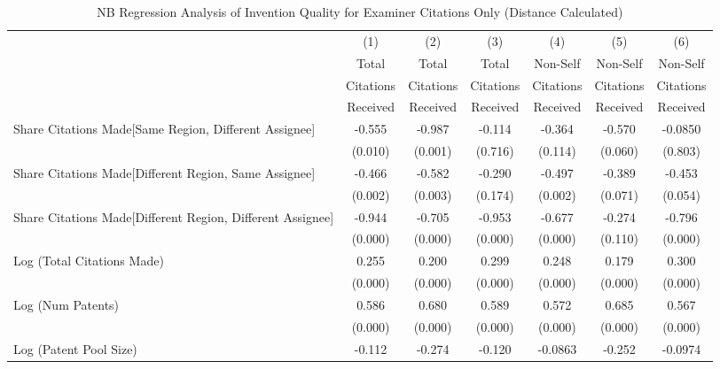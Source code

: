 \begin{table}[htbp]\centering
\caption{NB Regression Analysis of Invention Quality for Examiner Citations Only (Distance Calculated) \label{e.model123192021}}
\scriptsize
\singlespacing
\begin{tabular}{l*{6}{c}}
\hline\hline
                &\multicolumn{1}{c}{(1)}&\multicolumn{1}{c}{(2)}&\multicolumn{1}{c}{(3)}&\multicolumn{1}{c}{(4)}&\multicolumn{1}{c}{(5)}&\multicolumn{1}{c}{(6)}\\
                &\multicolumn{1}{c}{Total}&\multicolumn{1}{c}{Total}&\multicolumn{1}{c}{Total}&\multicolumn{1}{c}{Non-Self}&\multicolumn{1}{c}{Non-Self}&\multicolumn{1}{c}{Non-Self}\\
                &\multicolumn{1}{c}{Citations}&\multicolumn{1}{c}{Citations}&\multicolumn{1}{c}{Citations}&\multicolumn{1}{c}{Citations}&\multicolumn{1}{c}{Citations}&\multicolumn{1}{c}{Citations}\\
                 &\multicolumn{1}{c}{Received}&\multicolumn{1}{c}{Received}&\multicolumn{1}{c}{Received}&\multicolumn{1}{c}{Received}&\multicolumn{1}{c}{Received}&\multicolumn{1}{c}{Received}\\
\hline
Share Citations Made[Same Region, Different Assignee]&   -0.555&   -0.987&   -0.114&   -0.364&   -0.570&  -0.0850\\
                &  (0.010)&  (0.001)&  (0.716)&  (0.114)&  (0.060)&  (0.803)\\
Share Citations Made[Different Region, Same Assignee]&   -0.466&   -0.582&   -0.290&   -0.497&   -0.389&   -0.453\\
                &  (0.002)&  (0.003)&  (0.174)&  (0.002)&  (0.071)&  (0.054)\\
Share Citations Made[Different Region, Different Assignee]&   -0.944&   -0.705&   -0.953&   -0.677&   -0.274&   -0.796\\
                &  (0.000)&  (0.000)&  (0.000)&  (0.000)&  (0.110)&  (0.000)\\
Log (Total Citations Made)&    0.255&    0.200&    0.299&    0.248&    0.179&    0.300\\
                &  (0.000)&  (0.000)&  (0.000)&  (0.000)&  (0.000)&  (0.000)\\
Log (Num Patents)&    0.586&    0.680&    0.589&    0.572&    0.685&    0.567\\
                &  (0.000)&  (0.000)&  (0.000)&  (0.000)&  (0.000)&  (0.000)\\
Log (Patent Pool Size)&   -0.112&   -0.274&   -0.120&  -0.0863&   -0.252&  -0.0974\\

\end{tabular}
\end{table}
